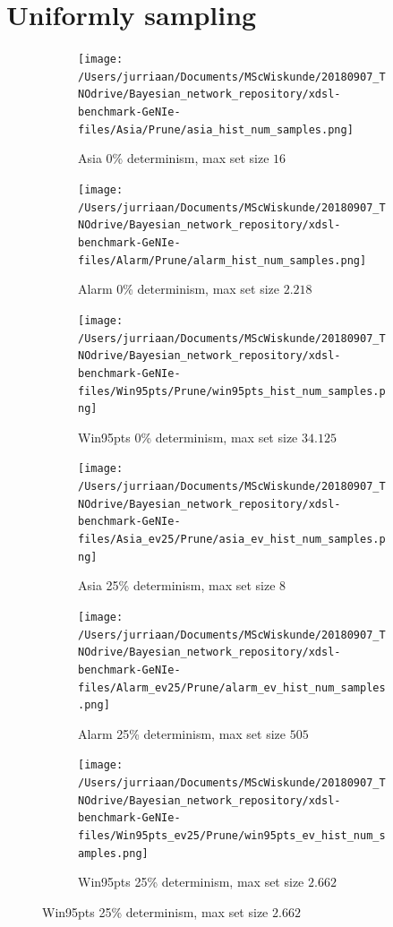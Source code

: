 \documentclass[a4paper, twoside, 11pt]{report}
\theoremstyle{plain}
\theoremstyle{definition}
\theoremstyle{remark}
\begin{document}
\section{Uniformly sampling}
\begin{figure}[h!]
\centering
\captionsetup[subfigure]{justification=centering}

\begin{subfigure}{.3\linewidth}
\texttt{[image: /Users/jurriaan/Documents/MScWiskunde/20180907\_TNOdrive/Bayesian\_network\_repository/xdsl-benchmark-GeNIe-files/Asia/Prune/asia\_hist\_num\_samples.png]}
\caption{Asia 0\% determinism, max set size $16$}%
\label{asia_ev}%
\end{subfigure}\hfill%
\begin{subfigure}{.3\linewidth}
\texttt{[image: /Users/jurriaan/Documents/MScWiskunde/20180907\_TNOdrive/Bayesian\_network\_repository/xdsl-benchmark-GeNIe-files/Alarm/Prune/alarm\_hist\_num\_samples.png]}
\caption{Alarm 0\% determinism, max set size $2.218$}%
\label{alarm_ev}%
\end{subfigure}\hfill%
\begin{subfigure}{.3\linewidth}
\texttt{[image: /Users/jurriaan/Documents/MScWiskunde/20180907\_TNOdrive/Bayesian\_network\_repository/xdsl-benchmark-GeNIe-files/Win95pts/Prune/win95pts\_hist\_num\_samples.png]}
\caption{Win95pts 0\% determinism, max set size $34.125$}%
\label{win95pts_ev}%
\end{subfigure}\hfill%

\begin{subfigure}{.3\linewidth}
\texttt{[image: /Users/jurriaan/Documents/MScWiskunde/20180907\_TNOdrive/Bayesian\_network\_repository/xdsl-benchmark-GeNIe-files/Asia\_ev25/Prune/asia\_ev\_hist\_num\_samples.png]}
\caption{Asia 25\% determinism, max set size $8$}%
\label{asia_ev}%
\end{subfigure}\hfill%
\begin{subfigure}{.3\linewidth}
\texttt{[image: /Users/jurriaan/Documents/MScWiskunde/20180907\_TNOdrive/Bayesian\_network\_repository/xdsl-benchmark-GeNIe-files/Alarm\_ev25/Prune/alarm\_ev\_hist\_num\_samples.png]}
\caption{Alarm 25\% determinism, max set size $505$}%
\label{alarm_ev}%
\end{subfigure}\hfill%
\begin{subfigure}{.3\linewidth}
\texttt{[image: /Users/jurriaan/Documents/MScWiskunde/20180907\_TNOdrive/Bayesian\_network\_repository/xdsl-benchmark-GeNIe-files/Win95pts\_ev25/Prune/win95pts\_ev\_hist\_num\_samples.png]}
\caption{Win95pts 25\% determinism, max set size $2.662$}%
\label{win95pts_ev}%
\end{subfigure}\hfill%


\end{figure}
\end{document}
